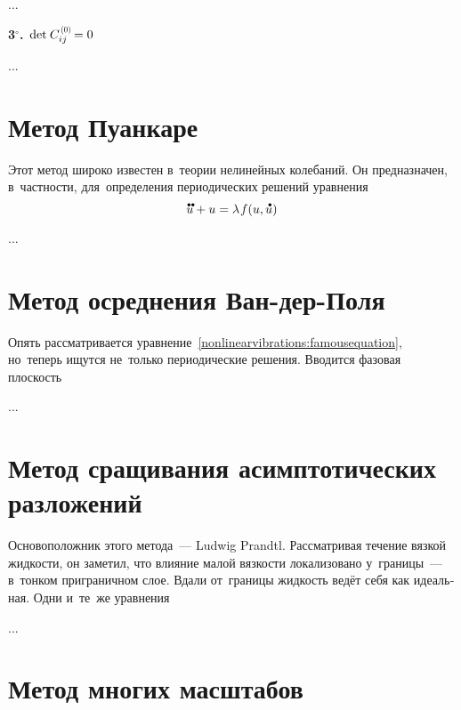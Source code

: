 \begin{otherlanguage}{russian}
...


\indent \textbf{3$^{\circ}$\hspace{-1ex}.}\, ${\operatorname{det} \hspace{.16ex} C_{ij}^{\hspace{0.2ex}\scalebox{0.66}[0.66]{(0)}} \hspace{-0.25ex} = 0}$

...




\section{Метод Пуанкаре}

Этот метод широко известен в~теории нелинейных колебаний. Он предназначен, в~частности, для~определения периодических решений уравнения
\begin{equation}\label{nonlinearvibrations:famousequation}
\mathdotdotabove{u} + u = \lambda \hspace{.16ex} f(u, \mathdotabove{u})
\end{equation}

...




\section{Метод осреднения Ван\hbox{-}дер\hbox{-}Поля}

Опять рассматривается уравнение~\eqref{nonlinearvibrations:famousequation}, но~теперь ищутся не~только периодические решения. Вводится фазовая плоскость

...




\section{Метод сращивания асимптотических разложений}

Основоположник этого метода~--- Ludwig Prandtl. Рассматривая течение вязкой жидкости, он заметил, что влияние малой вязкости локализовано у~границы~--- в~тонком приграничном слое. Вдали от~границы жидкость ведёт себя как идеальная. Одни и~те~же уравнения

...




\section{Метод многих масштабов}


\end{otherlanguage}
